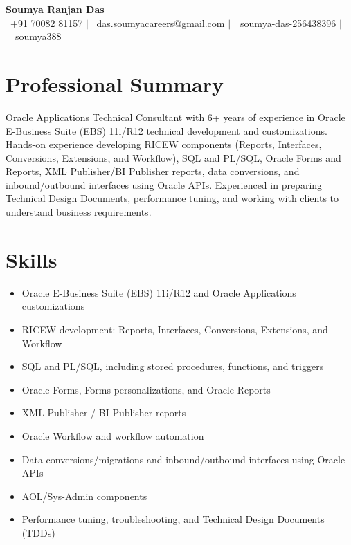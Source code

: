 \documentclass[11pt,a4paper]{article}
\begin{document}
\begin{center}
    {\LARGE \textcolor{primary}{\textbf{Soumya Ranjan Das}}}\\[6pt]
    \small
    \href{tel:+917008281157}{\faPhone\ +91 70082 81157} $\mid$
    \href{mailto:das.soumyacareers@gmail.com}{\faEnvelope\ das.soumyacareers@gmail.com} $\mid$\
    \href{https://www.linkedin.com/in/soumya-das-256438396/}{\faLinkedin\ soumya-das-256438396} $\mid$\
    \href{http://leetcode.com/u/soumya388}{\faCode\ soumya388}
\end{center}

\vspace{0.2cm}

\section*{Professional Summary}
Oracle Applications Technical Consultant with 6+ years of experience in Oracle E-Business Suite (EBS) 11i/R12 technical development and customizations. Hands-on experience developing RICEW components (Reports, Interfaces, Conversions, Extensions, and Workflow), SQL and PL/SQL, Oracle Forms and Reports, XML Publisher/BI Publisher reports, data conversions, and inbound/outbound interfaces using Oracle APIs. Experienced in preparing Technical Design Documents, performance tuning, and working with clients to understand business requirements.

\section*{Skills}
\begin{itemize}
    \item Oracle E-Business Suite (EBS) 11i/R12 and Oracle Applications customizations
    \item RICEW development: Reports, Interfaces, Conversions, Extensions, and Workflow
    \item SQL and PL/SQL, including stored procedures, functions, and triggers
    \item Oracle Forms, Forms personalizations, and Oracle Reports
    \item XML Publisher / BI Publisher reports
    \item Oracle Workflow and workflow automation
    \item Data conversions/migrations and inbound/outbound interfaces using Oracle APIs
    \item AOL/Sys-Admin components
    \item Performance tuning, troubleshooting, and Technical Design Documents (TDDs)
\end{itemize}
\end{document}
